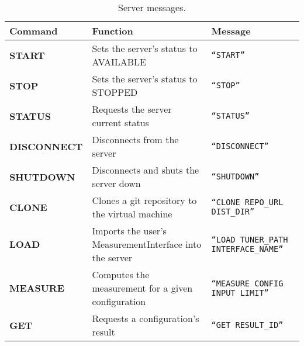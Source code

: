 \newcommand{\specialcell}[2][c]{%
  \begin{tabular}[#1]{@{}K@{}}#2\end{tabular}}


\begin{table}[htpb]
    \centering
    \tiny
    \begin{tabular}{@{}TLK@{}}
        \toprule
        {\bf Command} & {\bf Function} & {\bf Message} \\ \midrule
        {\tiny \bf START} & 
        {\tiny Sets the server's status to AVAILABLE} & 
        {\tiny \tt ``START''} \\ \midrule
        {\tiny \bf STOP} & 
        {\tiny Sets the server's status to STOPPED} & 
        {\tiny \tt ``STOP''} \\ \midrule
        {\tiny \bf STATUS} & 
        {\tiny Requests the server current status} & 
        {\tiny \tt ``STATUS''} \\ \midrule
        {\tiny \bf DISCONNECT} & 
        {\tiny Disconnects from the server} & 
        {\tiny \tt ``DISCONNECT''} \\ \midrule
        {\tiny \bf SHUTDOWN} & 
        {\tiny Disconnects and shuts the server down} & 
        {\tiny \tt ``SHUTDOWN''} \\ \midrule
        {\tiny \bf CLONE} & 
        {\tiny Clones a git repository to the virtual machine} & 
        {\tiny \tt ``CLONE REPO\_URL DIST\_DIR''} \\ \midrule
        {\tiny \bf LOAD} & 
        {\tiny Imports the user's MeasurementInterface into the server} & 
        {\tiny \tt ``LOAD TUNER\_PATH INTERFACE\_NAME''} \\ \midrule
        {\tiny \bf MEASURE} & 
        {\tiny Computes the measurement for a given configuration} & 
        {\tiny \tt ``MEASURE CONFIG INPUT LIMIT''} \\ \midrule
        {\tiny \bf GET} & 
        {\tiny Requests a configuration's result} & 
        {\tiny \tt ``GET RESULT\_ID''} \\ \bottomrule
    \end{tabular}
    \caption{Server messages.}
    \label{tab:protocol-messages}
\end{table}

